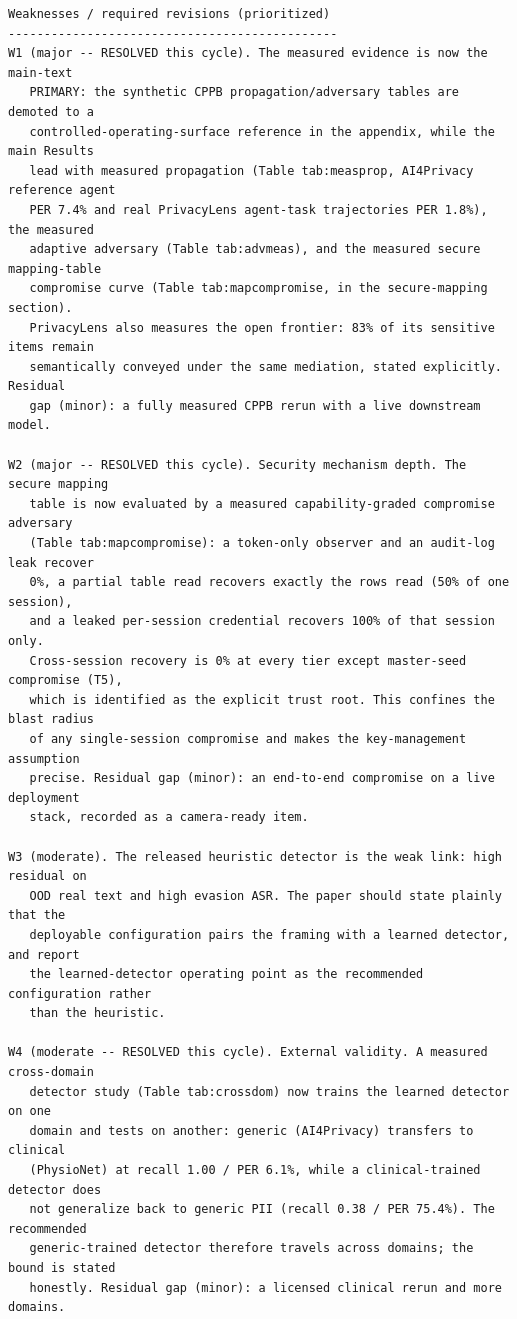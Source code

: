 \documentclass[10pt]{article}
\begin{document}
\begin{verbatim}
Weaknesses / required revisions (prioritized)
----------------------------------------------
W1 (major -- RESOLVED this cycle). The measured evidence is now the main-text
   PRIMARY: the synthetic CPPB propagation/adversary tables are demoted to a
   controlled-operating-surface reference in the appendix, while the main Results
   lead with measured propagation (Table tab:measprop, AI4Privacy reference agent
   PER 7.4% and real PrivacyLens agent-task trajectories PER 1.8%), the measured
   adaptive adversary (Table tab:advmeas), and the measured secure mapping-table
   compromise curve (Table tab:mapcompromise, in the secure-mapping section).
   PrivacyLens also measures the open frontier: 83% of its sensitive items remain
   semantically conveyed under the same mediation, stated explicitly. Residual
   gap (minor): a fully measured CPPB rerun with a live downstream model.

W2 (major -- RESOLVED this cycle). Security mechanism depth. The secure mapping
   table is now evaluated by a measured capability-graded compromise adversary
   (Table tab:mapcompromise): a token-only observer and an audit-log leak recover
   0%, a partial table read recovers exactly the rows read (50% of one session),
   and a leaked per-session credential recovers 100% of that session only.
   Cross-session recovery is 0% at every tier except master-seed compromise (T5),
   which is identified as the explicit trust root. This confines the blast radius
   of any single-session compromise and makes the key-management assumption
   precise. Residual gap (minor): an end-to-end compromise on a live deployment
   stack, recorded as a camera-ready item.

W3 (moderate). The released heuristic detector is the weak link: high residual on
   OOD real text and high evasion ASR. The paper should state plainly that the
   deployable configuration pairs the framing with a learned detector, and report
   the learned-detector operating point as the recommended configuration rather
   than the heuristic.

W4 (moderate -- RESOLVED this cycle). External validity. A measured cross-domain
   detector study (Table tab:crossdom) now trains the learned detector on one
   domain and tests on another: generic (AI4Privacy) transfers to clinical
   (PhysioNet) at recall 1.00 / PER 6.1%, while a clinical-trained detector does
   not generalize back to generic PII (recall 0.38 / PER 75.4%). The recommended
   generic-trained detector therefore travels across domains; the bound is stated
   honestly. Residual gap (minor): a licensed clinical rerun and more domains.


\end{verbatim}
\end{document}
